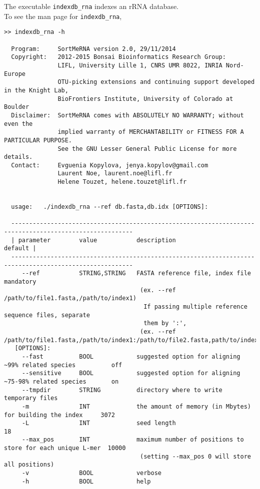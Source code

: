 \documentclass[10pt,a4paper]{article}
\begin{document}
\noindent The executable \texttt{indexdb\_rna} indexes an rRNA database.\\

\noindent To see the man page for \texttt{indexdb\_rna}, 

\begin{Verbatim}[fontsize=\footnotesize]
>> indexdb_rna -h

  Program:     SortMeRNA version 2.0, 29/11/2014
  Copyright:   2012-2015 Bonsai Bioinformatics Research Group:
               LIFL, University Lille 1, CNRS UMR 8022, INRIA Nord-Europe
               OTU-picking extensions and continuing support developed in the Knight Lab,
               BioFrontiers Institute, University of Colorado at Boulder
  Disclaimer:  SortMeRNA comes with ABSOLUTELY NO WARRANTY; without even the
               implied warranty of MERCHANTABILITY or FITNESS FOR A PARTICULAR PURPOSE.
               See the GNU Lesser General Public License for more details.
  Contact:     Evguenia Kopylova, jenya.kopylov@gmail.com 
               Laurent Noe, laurent.noe@lifl.fr
               Helene Touzet, helene.touzet@lifl.fr


  usage:   ./indexdb_rna --ref db.fasta,db.idx [OPTIONS]:

  --------------------------------------------------------------------------------------------------------
  | parameter        value           description                                                 default |
  --------------------------------------------------------------------------------------------------------
     --ref           STRING,STRING   FASTA reference file, index file                            mandatory
                                      (ex. --ref /path/to/file1.fasta,/path/to/index1)
                                       If passing multiple reference sequence files, separate
                                       them by ':',
                                      (ex. --ref /path/to/file1.fasta,/path/to/index1:/path/to/file2.fasta,path/to/index2)
   [OPTIONS]:
     --fast          BOOL            suggested option for aligning ~99% related species          off
     --sensitive     BOOL            suggested option for aligning ~75-98% related species       on
     --tmpdir        STRING          directory where to write temporary files
     -m              INT             the amount of memory (in Mbytes) for building the index     3072 
     -L              INT             seed length                                                 18
     --max_pos       INT             maximum number of positions to store for each unique L-mer  10000
                                      (setting --max_pos 0 will store all positions)
     -v              BOOL            verbose
     -h              BOOL            help
\end{Verbatim}
\end{document}
